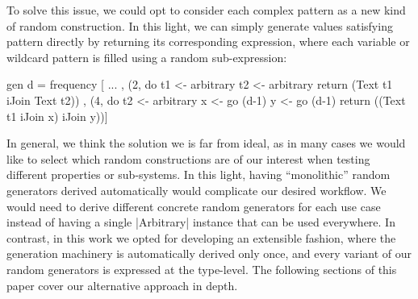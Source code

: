 To solve this issue, we could opt to consider each complex pattern as a new kind
of random construction.
%
In this light, we can simply generate values satisfying pattern directly by
returning its corresponding expression, where each variable or wildcard pattern
is filled using a random sub-expression:

\begin{code}
  gen d = frequency
    [ ...
    , (2, do  t1  <- arbitrary
              t2  <- arbitrary
              return (Text t1 iJoin Text t2))
    , (4, do  t2  <- arbitrary
              x   <- go (d-1)
              y   <- go (d-1)
              return ((Text t1 iJoin x) iJoin y))]
\end{code}%



%
In general, we think the solution we is far from ideal, as in many cases we
would like to select which random constructions are of our interest when testing
different properties or sub-systems.
%
In this light, having ``monolithic'' random generators derived automatically
would complicate our desired workflow.
%
We would need to derive different concrete random generators for each use case
instead of having a single |Arbitrary| instance that can be used everywhere.
%
In contrast, in this work we opted for developing an extensible fashion, where
the generation machinery is automatically derived only once, and every variant
of our random generators is expressed at the type-level.
%
The following sections of this paper cover our alternative approach in depth.
